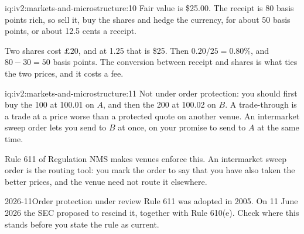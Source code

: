 \begin{solution}{iq:iv2:markets-and-microstructure:10}
Fair value is \$25.00. The receipt is 80 basis points rich, so sell it, buy the shares and hedge the currency, for about 50 basis points, or about 12.5 cents a receipt.

Two shares cost $\pounds 20$, and at 1.25 that is \$25. Then $0.20/25 = 0.80\%$, and $80 - 30 = 50$ basis points. The conversion between receipt and shares is what ties the two prices, and it costs a fee.

\end{solution}

\begin{solution}{iq:iv2:markets-and-microstructure:11}
Not under order protection: you should first buy the 100 at 100.01 on $A$, and then the 200 at 100.02 on $B$. A trade-through is a trade at a price worse than a protected quote on another venue. An intermarket sweep order lets you send to $B$ at once, on your promise to send to $A$ at the same time.

Rule 611 of Regulation NMS makes venues enforce this. An intermarket sweep order is the routing tool: you mark the order to say that you have also taken the better prices, and the venue need not route it elsewhere.

\begin{dated}{2026-11}{Order protection under review}\label{dat:iv2:markets-and-microstructure:rule611}
Rule 611 was adopted in 2005. On 11 June 2026 the SEC proposed to rescind it, together with Rule 610(e). Check where this stands before you state the rule as current.
\end{dated}

\end{solution}

